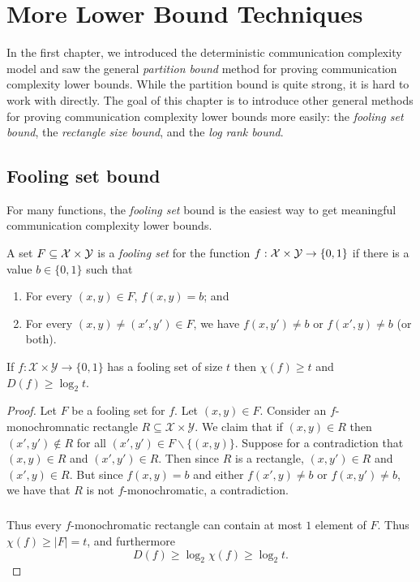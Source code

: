 
\chapter[Lower Bounds]{More Lower Bound Techniques}
In the first chapter, we introduced the deterministic communication complexity 
model and saw the general \emph{partition bound} method for proving communication complexity lower bounds. While the partition bound is quite strong, it is hard to work with directly. The goal of this chapter is to introduce other general methods for proving communication complexity lower bounds more easily: the \emph{fooling set bound}, the \emph{rectangle size bound}, and the \emph{log rank bound}.



\newpage \section{Fooling set bound}

For many functions, the \emph{fooling set} bound is the easiest way to get meaningful communication complexity lower bounds.

\begin{definition}
A set $F \subseteq \mathcal{X} \times \mathcal{Y}$ is a \emph{fooling set} for the function $f : \mathcal{X} \times \mathcal{Y} \to \{0,1\}$ if there is a value $b \in \{0,1\}$ such that
\begin{enumerate}
\item For every $(x,y) \in F$, $f(x,y) = b$; and
\item For every $(x,y) \neq (x',y') \in F$, we have $f(x,y') \neq b$ or $f(x',y) \neq b$ (or both).
\end{enumerate}
\end{definition}

\begin{lemma}
If $f : \mathcal{X} \times \mathcal{Y} \to \{0,1\}$ has a fooling set of size $t$ then $\chi(f) \ge t$ and $D(f) \ge \log_2 t$.
\end{lemma}

\begin{proof}
Let $F$ be a fooling set for $f$. Let $(x,y) \in F$. Consider an $f$-monochromnatic rectangle $R \subseteq \mathcal{X}\times \mathcal{Y}$. We claim that if $(x,y) \in R$ then $(x',y') \not\in R$ for all $(x',y') \in F\backslash\{(x,y)\}$. Suppose for a contradiction that $(x,y) \in R$ and $(x',y') \in R$. Then since $R$ is a rectangle, $(x,y') \in R$ and $(x',y) \in R$. But since $f(x,y) = b$ and either $f(x',y) \neq b$ or $f(x,y') \neq b$, we have that $R$ is not $f$-monochromatic, a contradiction.
\paragraph{}
Thus every $f$-monochromatic rectangle can contain at most $1$ element of $F$. Thus $\chi(f) \geq |F| = t$, and furthermore
$$D(f) \geq \log_2\chi(f) \geq \log_2 t.$$
\end{proof}


